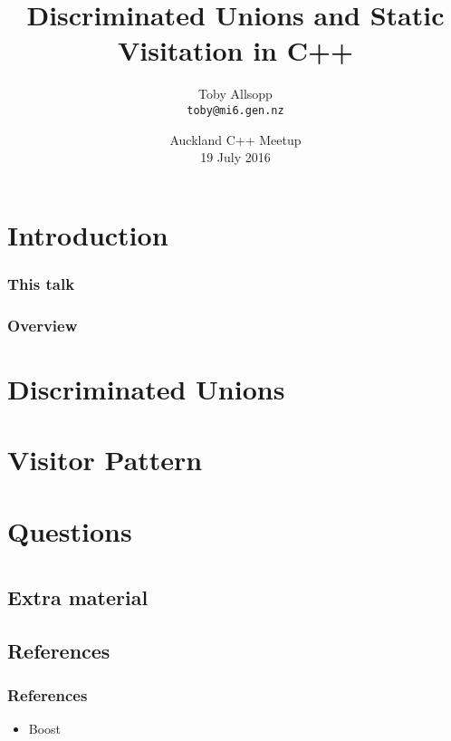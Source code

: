 \documentclass[aspectratio=169]{beamer}
\date{Auckland C++ Meetup\\19 July 2016}
\title{Discriminated Unions and Static Visitation in C++}
\subtitle{}
\author[Toby Allsopp]{Toby Allsopp\\\texttt{toby@mi6.gen.nz}}
\begin{document}

\frame{\titlepage}

\section{Introduction}

\begin{frame}
  \frametitle{This talk}
\end{frame}

\begin{frame}
  \frametitle{Overview}
  \tableofcontents
\end{frame}


\section{Discriminated Unions}

\begin{frame}[fragile]
\end{frame}


\section{Visitor Pattern}

\begin{frame}[fragile]
\end{frame}


\section{Questions}

\begin{frame}
\end{frame}


\appendix

\section{\appendixname}
\frame{\tableofcontents}

\subsection{Extra material}

\subsection{References}

\begin{frame}[fragile]
  \frametitle{References}
  \begin{itemize}
  \item Boost
  \end{itemize}
\end{frame}
\end{document}
